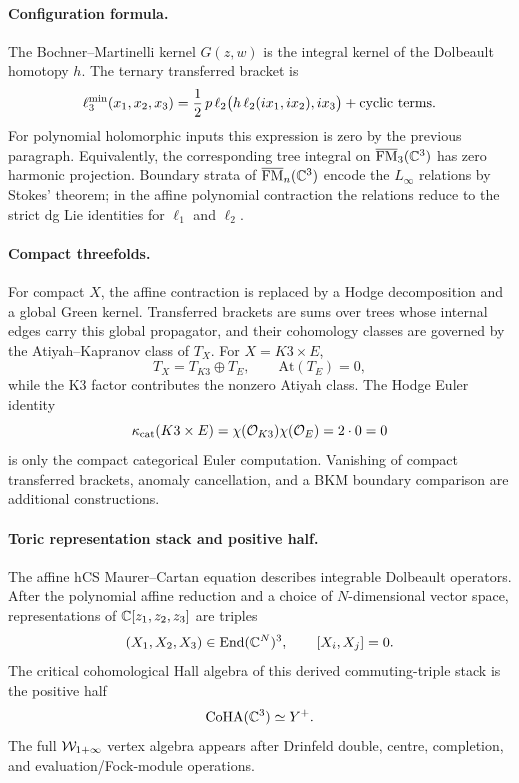 \paragraph{Configuration formula.}
The Bochner--Martinelli kernel \(G(z,w)\) is the integral kernel of the
Dolbeault homotopy \(h\).  The ternary transferred bracket is
\[
  \ell_3^{\min}(x_1,x_2,x_3)
  =
  \frac12\,p\,\ell_2\bigl(h\,\ell_2(ix_1,ix_2),ix_3\bigr)
  +\hbox{cyclic terms}.
\]
For polynomial holomorphic inputs this expression is zero by the
previous paragraph.  Equivalently, the corresponding tree integral on
\(\overline{\mathrm{FM}}_3(\mathbb C^3)\) has zero harmonic projection.  Boundary
strata of \(\overline{\mathrm{FM}}_n(\mathbb C^3)\) encode the \(L_\infty\) relations
by Stokes' theorem; in the affine polynomial contraction the relations
reduce to the strict dg Lie identities for \(\ell_1\) and \(\ell_2\).

\paragraph{Compact threefolds.}
For compact \(X\), the affine contraction is replaced by a Hodge
decomposition and a global Green kernel.  Transferred brackets are sums
over trees whose internal edges carry this global propagator, and their
cohomology classes are governed by the Atiyah--Kapranov class of
\(T_X\).  For \(X=K3\times E\),
\[
  T_X=T_{K3}\oplus T_E,
  \qquad
  \mathrm{At}(T_E)=0,
\]
while the K3 factor contributes the nonzero Atiyah class.  The Hodge
Euler identity
\[
  \kappa_{\mathrm{cat}}(K3\times E)
  =
  \chi(\mathcal O_{K3})\chi(\mathcal O_E)
  =
  2\cdot0
  =
  0
\]
is only the compact categorical Euler computation.  Vanishing of compact
transferred brackets, anomaly cancellation, and a BKM boundary
comparison are additional constructions.

\paragraph{Toric representation stack and positive half.}
The affine hCS Maurer--Cartan equation describes integrable Dolbeault
operators.  After the polynomial affine reduction and a choice of
\(N\)-dimensional vector space, representations of
\(\mathbb C[z_1,z_2,z_3]\) are triples
\[
  (X_1,X_2,X_3)\in\mathrm{End}(\mathbb C^N)^3,
  \qquad
  [X_i,X_j]=0.
\]
The critical cohomological Hall algebra of this derived commuting-triple
stack is the positive half
\[
  \mathrm{CoHA}(\mathbb C^3)\simeq Y^+ .
\]
The full \(\mathcal W_{1+\infty}\) vertex algebra appears after Drinfeld
double, centre, completion, and evaluation/Fock-module operations.

